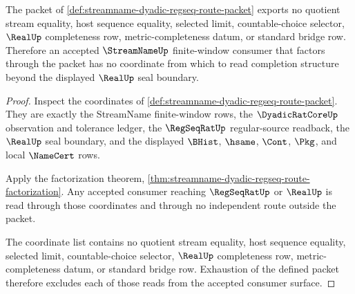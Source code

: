 \begin{theorem}
\label{thm:streamname-dyadic-regseq-route-no-completion-leak}
The packet of \autoref{def:streamname-dyadic-regseq-route-packet} exports no
quotient stream equality, host sequence equality, selected limit,
countable-choice selector, $\RealUp$ completeness row, metric-completeness
datum, or standard bridge row. Therefore an accepted $\StreamNameUp$
finite-window consumer that factors through the packet has no coordinate from
which to read completion structure beyond the displayed $\RealUp$ seal
boundary.
\end{theorem}
\begin{proof}
Inspect the coordinates of
\autoref{def:streamname-dyadic-regseq-route-packet}. They are exactly the
StreamName finite-window rows, the $\DyadicRatCoreUp$ observation and
tolerance ledger, the $\RegSeqRatUp$ regular-source readback, the $\RealUp$
seal boundary, and the displayed $\BHist$, $\hsame$, $\Cont$, $\Pkg$, and
local $\NameCert$ rows.

Apply the factorization theorem,
\autoref{thm:streamname-dyadic-regseq-route-factorization}. Any accepted
consumer reaching $\RegSeqRatUp$ or $\RealUp$ is read through those coordinates
and through no independent route outside the packet.

The coordinate list contains no quotient stream equality, host sequence
equality, selected limit, countable-choice selector, $\RealUp$ completeness
row, metric-completeness datum, or standard bridge row. Exhaustion of the
defined packet therefore excludes each of those reads from the accepted
consumer surface.
\end{proof}
